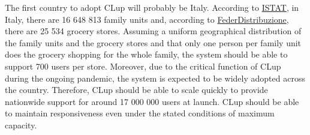 \documentclass[../../main.tex]{subfiles}
\begin{document}
The first country to adopt CLup will probably be Italy. According to \href{http://dati-censimentopopolazione.istat.it/Index.aspx?DataSetCode=DICA_NUCLEI}{ISTAT}, in Italy, 
there are 16 648 813 family units and, according to \href{https://www.federdistribuzione.it/mappa-distributiva/}{FederDistribuzione}, there are 25 534 grocery stores. 
Assuming a uniform geographical distribution of the family units and the grocery stores and that only one person per family unit does the grocery shopping for the whole family, 
the system should be able to support 700 users per store. 
Moreover, due to the critical function of CLup during the ongoing pandemic, the system is expected to be widely adopted across the country. 
Therefore, CLup should be able to scale quickly to provide nationwide support for around 17 000 000 users at launch. 
CLup should be able to maintain responsiveness even under the stated conditions of maximum capacity.
\end{document}

